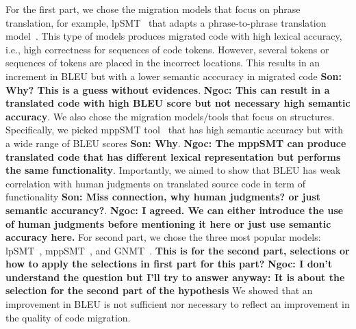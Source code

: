 For the first part, we chose the migration models that focus on phrase
translation, for example, lpSMT~\cite{fse13-nier} that adapts a
phrase-to-phrase translation model~\cite{phrasal10}. This type of
models produces migrated code with high lexical accuracy, i.e., high
correctness for sequences of code tokens. However, several tokens or
sequences of tokens are placed in the incorrect locations.  This
results in an increment in BLEU but with a lower semantic acccuracy in
migrated code \textbf{Son: Why? This is a guess without evidences}. \textbf{Ngoc: This can result in a translated code with high BLEU score but not necessary high semantic accuracy}. We also chose the migration models/tools that focus on
structures. Specifically, we picked mppSMT tool~\cite{ase15} that has
high semantic accuracy but with a wide range of BLEU
scores \textbf{Son: Why}. \textbf{Ngoc: The mppSMT can produce translated code that has different lexical representation but performs the same functionality}. Importantly, we aimed to show that BLEU has weak correlation
with human judgments on translated source code in term of
functionality \textbf{Son: Miss connection, why human judgments? or just semantic accurancy?}. 
\textbf{Ngoc: I agreed. We can either introduce the use of human judgments before mentioning it here or just use semantic accuracy here.} 
For second part, we chose the three most popular
models: lpSMT~\cite{fse13-nier}, mppSMT~\cite{ase15}, and
GNMT~\cite{tien}. 
\textbf{This is for the second part, selections or how to apply the selections in first part for this part?}
\textbf{Ngoc: I don't understand the question but I'll try to answer anyway: It is about the selection for the second part of the hypothesis}  
We showed that an improvement in BLEU is not
sufficient nor necessary to reflect an improvement in the quality of
code migration.

